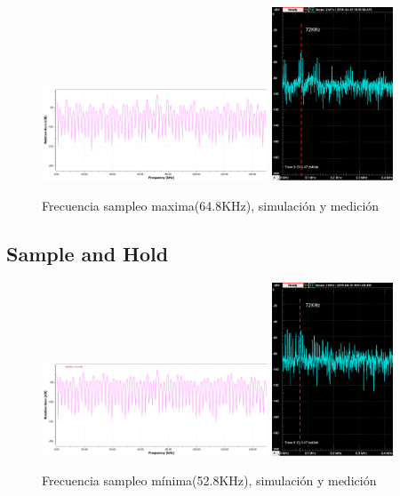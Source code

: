 \documentclass[../../ASSD_TP1_G7.tex]{subfiles}
\begin{document}
\begin{figure}[H]
\centering
{}
{\includegraphics[width=0.6\textwidth]{figures/simpto_8_llave_64,8khz_espectro.png}}
{\includegraphics[width=0.32\textwidth]{figures/pto_8_llave_64,8khz_espectro.png}}
\caption{Frecuencia sampleo maxima(64.8KHz), simulación y medición}
\end{figure}


\subsection*{Sample and Hold}


\begin{figure}[H]
\centering
{}
{\includegraphics[width=0.6\textwidth]{figures/simpto_8_syh_52,8_espectro.png}}
{\includegraphics[width=0.32\textwidth]{figures/pto_8_syh_52,8_espectro.png}}
\caption{Frecuencia sampleo mínima(52.8KHz), simulación y medición}
\end{figure}
\end{document}
